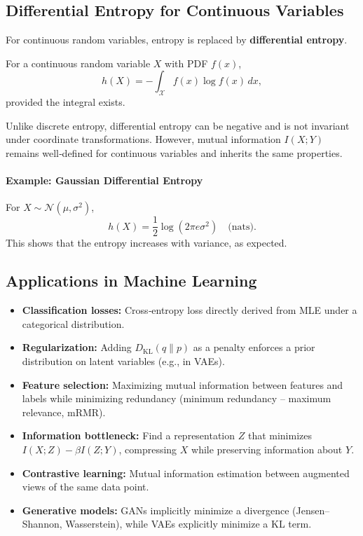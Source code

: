 \documentclass{tufte-handout}
\begin{document}
\subsection{Differential Entropy for Continuous Variables}

For continuous random variables, entropy is replaced by \textbf{differential entropy}.

\begin{defn}
    For a continuous random variable $X$ with PDF $f(x)$,
    \[
    h(X) = -\int_{\mathcal{X}} f(x) \log f(x)\,dx,
    \]
    provided the integral exists.
\end{defn}

\begin{remark}
    Unlike discrete entropy, differential entropy can be negative and is not invariant under coordinate transformations. However, mutual information $I(X;Y)$ remains well‑defined for continuous variables and inherits the same properties.
\end{remark}

\paragraph{Example: Gaussian Differential Entropy}
For $X \sim \mathcal{N}(\mu, \sigma^2)$,
\[
h(X) = \frac{1}{2} \log(2\pi e \sigma^2) \quad \text{(nats)}.
\]
This shows that the entropy increases with variance, as expected.

\subsection{Applications in Machine Learning}

\begin{itemize}
    \item \textbf{Classification losses:} Cross‑entropy loss directly derived from MLE under a categorical distribution.
    \item \textbf{Regularization:} Adding $D_{\text{KL}}(q \parallel p)$ as a penalty enforces a prior distribution on latent variables (e.g., in VAEs).
    \item \textbf{Feature selection:} Maximizing mutual information between features and labels while minimizing redundancy (minimum redundancy – maximum relevance, mRMR).
    \item \textbf{Information bottleneck:} Find a representation $Z$ that minimizes $I(X;Z) - \beta I(Z;Y)$, compressing $X$ while preserving information about $Y$.
    \item \textbf{Contrastive learning:} Mutual information estimation between augmented views of the same data point.
    \item \textbf{Generative models:} GANs implicitly minimize a divergence (Jensen–Shannon, Wasserstein), while VAEs explicitly minimize a KL term.
\end{itemize}
\end{document}
